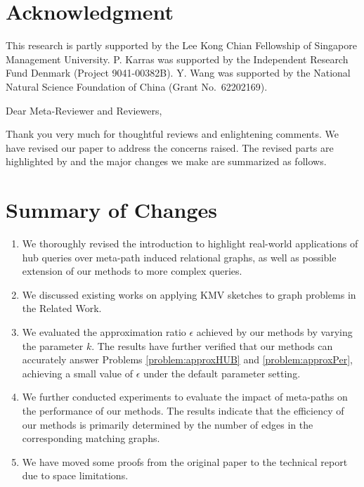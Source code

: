 \section*{Acknowledgment}
This research is partly supported by the Lee Kong Chian Fellowship of Singapore Management University.
P. Karras was supported by the Independent Research Fund Denmark (Project 9041-00382B).
Y. Wang was supported by the National Natural Science Foundation of China (Grant No.~62202169).


\noindent
Dear Meta-Reviewer and Reviewers,

Thank you very much for thoughtful reviews and enlightening comments.
We have revised our paper to address the concerns raised.
The revised parts are highlighted by  and the major changes we make are summarized as follows.

\section*{Summary of Changes}
\begin{enumerate}
    \item We thoroughly revised the introduction to highlight real-world applications of hub queries over meta-path induced relational graphs, as well as possible extension of our methods to more complex queries.
    \item We discussed existing works on applying KMV sketches to graph problems in the Related Work.
    \item We evaluated the approximation ratio $\epsilon$ achieved by our methods by varying the parameter $k$. The results have further verified that our methods can accurately answer Problems \ref{problem:approxHUB} and \ref{problem:approxPer}, achieving a small value of $\epsilon$ under the default parameter setting.
    \item We further conducted experiments to evaluate the impact of meta-paths on the performance of our methods. The results indicate that the efficiency of our methods is primarily determined by the number of edges in the corresponding matching graphs.
    \item We have moved some proofs from the original paper to the technical report~\cite{hud2023tr} due to space limitations.
\end{enumerate}